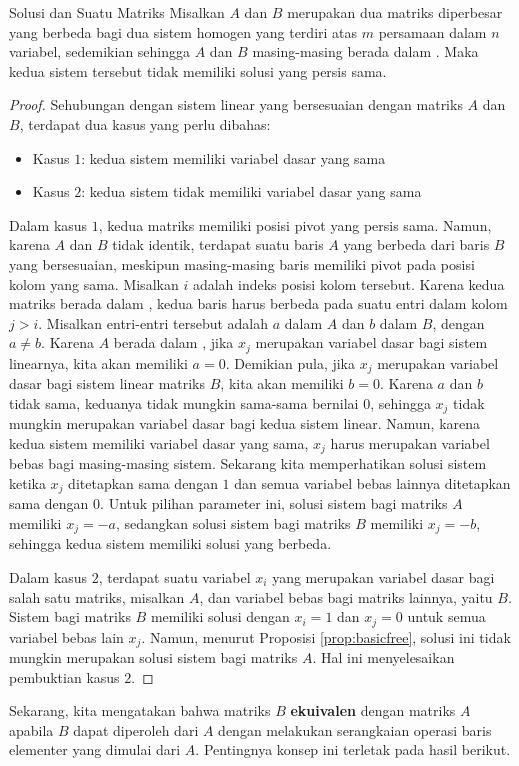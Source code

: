 \begin{lemma}{Solusi dan \RREF \;Suatu Matriks}\label{lem:rrefsolutions}
Misalkan $A$ dan $B$ merupakan dua matriks diperbesar yang berbeda bagi dua sistem homogen yang terdiri atas $m$ persamaan dalam $n$ variabel, sedemikian sehingga $A$ dan $B$ masing-masing berada dalam \rref. Maka kedua sistem tersebut tidak memiliki solusi yang persis sama.
\end{lemma}
\ifdefined\showproofs
\begin{proof}
Sehubungan dengan sistem linear yang bersesuaian dengan matriks $A$ dan $B$, terdapat dua kasus yang perlu dibahas:
\begin{itemize}
\item Kasus $1$: kedua sistem memiliki variabel dasar yang sama
\item Kasus $2$: kedua sistem tidak memiliki variabel dasar yang sama
\end{itemize}
Dalam kasus $1$, kedua matriks memiliki posisi pivot yang persis sama. Namun, karena $A$ dan $B$ tidak identik, terdapat suatu baris $A$ yang berbeda dari baris $B$ yang bersesuaian, meskipun masing-masing baris memiliki pivot pada posisi kolom yang sama. Misalkan $i$ adalah indeks posisi kolom tersebut. Karena kedua matriks berada dalam \rref, kedua baris harus berbeda pada suatu entri dalam kolom $j>i$. Misalkan entri-entri tersebut adalah $a$ dalam $A$ dan $b$ dalam $B$, dengan $a \neq b$. Karena $A$ berada dalam \rref, jika $x_j$ merupakan variabel dasar bagi sistem linearnya, kita akan memiliki $a=0$. Demikian pula, jika $x_j$ merupakan variabel dasar bagi sistem linear matriks $B$, kita akan memiliki $b=0$. Karena $a$ dan $b$ tidak sama, keduanya tidak mungkin sama-sama bernilai $0$, sehingga $x_j$ tidak mungkin merupakan variabel dasar bagi kedua sistem linear. Namun, karena kedua sistem memiliki variabel dasar yang sama, $x_j$ harus merupakan variabel bebas bagi masing-masing sistem. Sekarang kita memperhatikan solusi sistem ketika $x_j$ ditetapkan sama dengan $1$ dan semua variabel bebas lainnya ditetapkan sama dengan $0$. Untuk pilihan parameter ini, solusi sistem bagi matriks $A$ memiliki $x_j=-a$, sedangkan solusi sistem bagi matriks $B$ memiliki $x_j=-b$, sehingga kedua sistem memiliki solusi yang berbeda.

Dalam kasus $2$, terdapat suatu variabel $x_i$ yang merupakan variabel dasar bagi salah satu matriks, misalkan $A$, dan variabel bebas bagi matriks lainnya, yaitu $B$. Sistem bagi matriks $B$ memiliki solusi dengan $x_i=1$ dan $x_j=0$ untuk semua variabel bebas lain $x_j$. Namun, menurut Proposisi \ref{prop:basicfree}, solusi ini tidak mungkin merupakan solusi sistem bagi matriks $A$. Hal ini menyelesaikan pembuktian kasus $2$.
\end{proof}
\fi
Sekarang, kita mengatakan bahwa matriks $B$ \textbf{ekuivalen}  dengan matriks $A$ apabila $B$ dapat diperoleh dari $A$ dengan melakukan serangkaian operasi baris elementer yang dimulai dari $A$. Pentingnya konsep ini terletak pada hasil berikut.

